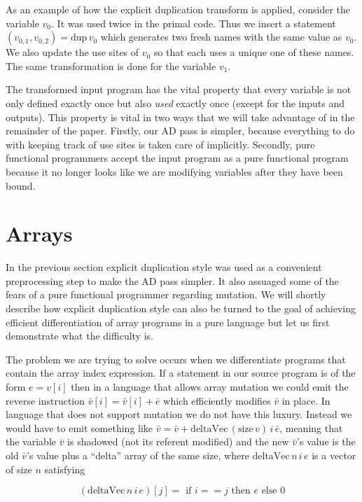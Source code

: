 \documentclass[12pt]{article}
\begin{document}
As an example of how the explicit duplication transform is applied,
consider the variable $v_0$.  It was used twice in the primal code.
Thus we insert a statement $(v_{0,1}, v_{0,2}) = \mathrm{dup} \, v_0$
which generates two fresh names with the same value as $v_0$.  We also
update the use sites of $v_0$ so that each uses a unique one of these
names.  The same transformation is done for the variable $v_1$.

The transformed input program has the vital property that every
variable is not only defined exactly once but also \emph{used} exactly
once (except for the inputs and outputs).  This property is vital in
two ways that we will take advantage of in the remainder of the paper.
Firstly, our AD pass is simpler, because everything to do with keeping
track of use sites is taken care of implicitly.  Secondly, pure
functional programmers accept the input program as a pure functional
program because it no longer looks like we are modifying variables
after they have been bound.

\section{Arrays}

In the previous section explicit duplication style was used as a
convenient preprocessing step to make the AD pass simpler.  It also
assuaged some of the fears of a pure functional programmer regarding
mutation.  We will shortly describe how explicit duplication style can
also be turned to the goal of achieving efficient differentiation of
array programs in a pure language but let us first demonstrate what
the difficulty is.

The problem we are trying to solve occurs when we differentiate
programs that contain the array index expression.  If a statement in
our source program is of the form $e = v[i]$ then in a language that
allows array mutation we could emit the reverse instruction
$\bar{v}[i] = \bar{v}[i] + \bar{e}$ which efficiently modifies
$\bar{v}$ in place.  In language that does not support mutation we do
not have this luxury.  Instead we would have to emit something like
$\bar{v} = \bar{v} + \textrm{deltaVec} \, (\textrm{size} \, v) \, i \,
\bar{e}$, meaning that the variable $\bar{v}$ is shadowed (not its
referent modified) and the new $\bar{v}$'s value is the old
$\bar{v}$'s value plus a ``delta'' array of the same size, where
$\textrm{deltaVec} \, n \, i \, e$ is a vector of size $n$ satisfying

\[
(\textrm{deltaVec} \, n \, i \, e)[j]
= \textrm{ if } i == j \textrm{ then } e  \textrm{ else } 0
\]
\end{document}
